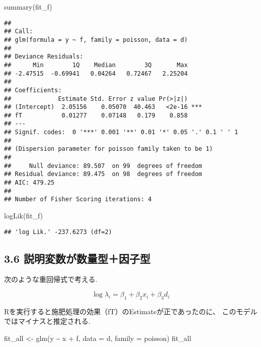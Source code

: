 \documentclass[
]{article}
\newenvironment{Shaded}{\begin{snugshade}}{\end{snugshade}}
\newcommand{\AttributeTok}[1]{\textcolor[rgb]{0.77,0.63,0.00}{#1}}
\newcommand{\FunctionTok}[1]{\textcolor[rgb]{0.00,0.00,0.00}{#1}}
\newcommand{\NormalTok}[1]{#1}
\newcommand{\OtherTok}[1]{\textcolor[rgb]{0.56,0.35,0.01}{#1}}
\newcommand{\SpecialCharTok}[1]{\textcolor[rgb]{0.00,0.00,0.00}{#1}}
\begin{document}
\begin{Shaded}
\begin{Highlighting}[]
\FunctionTok{summary}\NormalTok{(fit\_f)}
\end{Highlighting}
\end{Shaded}

\begin{verbatim}
## 
## Call:
## glm(formula = y ~ f, family = poisson, data = d)
## 
## Deviance Residuals: 
##      Min        1Q    Median        3Q       Max  
## -2.47515  -0.69941   0.04264   0.72467   2.25204  
## 
## Coefficients:
##             Estimate Std. Error z value Pr(>|z|)    
## (Intercept)  2.05156    0.05070  40.463   <2e-16 ***
## fT           0.01277    0.07148   0.179    0.858    
## ---
## Signif. codes:  0 '***' 0.001 '**' 0.01 '*' 0.05 '.' 0.1 ' ' 1
## 
## (Dispersion parameter for poisson family taken to be 1)
## 
##     Null deviance: 89.507  on 99  degrees of freedom
## Residual deviance: 89.475  on 98  degrees of freedom
## AIC: 479.25
## 
## Number of Fisher Scoring iterations: 4
\end{verbatim}

\begin{Shaded}
\begin{Highlighting}[]
\FunctionTok{logLik}\NormalTok{(fit\_f)}
\end{Highlighting}
\end{Shaded}

\begin{verbatim}
## 'log Lik.' -237.6273 (df=2)
\end{verbatim}

\hypertarget{ux8aacux660eux5909ux6570ux304cux6570ux91cfux578bux56e0ux5b50ux578b}{%
\subsection{3.6
説明変数が数量型＋因子型}\label{ux8aacux660eux5909ux6570ux304cux6570ux91cfux578bux56e0ux5b50ux578b}}

次のような重回帰式で考える.

\[
  \log \lambda_i = \beta_1 + \beta_2 x_i + \beta_3d_i
\]

Rを実行すると施肥処理の効果（fT）のEstimateが正であったのに、
このモデルではマイナスと推定される.

\begin{Shaded}
\begin{Highlighting}[]
\NormalTok{fit\_all }\OtherTok{\textless{}{-}} \FunctionTok{glm}\NormalTok{(y }\SpecialCharTok{\textasciitilde{}}\NormalTok{ x }\SpecialCharTok{+}\NormalTok{ f, }\AttributeTok{data =}\NormalTok{ d, }\AttributeTok{family =}\NormalTok{ poisson)}
\NormalTok{fit\_all}
\end{Highlighting}
\end{Shaded}
\end{document}
